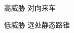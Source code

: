 \begin{subfigure}[b]{0.48\textwidth}
  \centering
  \caption{高威胁 \;\; 对向来车}
\end{subfigure}\hfill
\begin{subfigure}[b]{0.48\textwidth}
  \centering
  \caption{低威胁 \;\; 远处静态路锥}
\end{subfigure}
